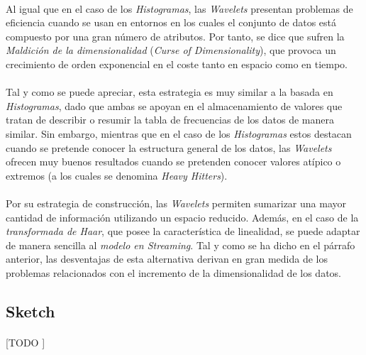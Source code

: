 \documentclass{subfiles}
\begin{document}
        \paragraph{}
        Al igual que en el caso de los \emph{Histogramas}, las \emph{Wavelets} presentan problemas de eficiencia cuando se usan en entornos en los cuales el conjunto de datos está compuesto por una gran número de atributos. Por tanto, se dice que sufren la \emph{Maldición de la dimensionalidad} (\emph{Curse of Dimensionality}), que provoca un crecimiento de orden exponencial en el coste tanto en espacio como en tiempo.

        \paragraph{}
        Tal y como se puede apreciar, esta estrategia es muy similar a la basada en \emph{Histogramas}, dado que ambas se apoyan en el almacenamiento de valores que tratan de describir o resumir la tabla de frecuencias de los datos de manera similar. Sin embargo, mientras que en el caso de los \emph{Histogramas} estos destacan cuando se pretende conocer la estructura general de los datos, las \emph{Wavelets} ofrecen muy buenos resultados cuando se pretenden conocer valores atípico o extremos (a los cuales se denomina \emph{Heavy Hitters}).

        \paragraph{}
        Por su estrategia de construcción, las \emph{Wavelets} permiten sumarizar una mayor cantidad de información utilizando un espacio reducido. Además, en el caso de la \emph{transformada de Haar}, que posee la característica de linealidad, se puede adaptar de manera sencilla al \emph{modelo en Streaming}. Tal y como se ha dicho en el párrafo anterior, las desventajas de esta alternativa derivan en gran medida de los problemas relacionados con el incremento de la dimensionalidad de los datos.

      \subsection{Sketch}
      \label{sec:sketch}

        \paragraph{}
        [TODO ]
\end{document}
